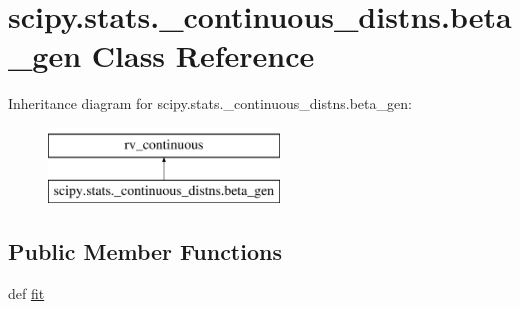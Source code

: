 \hypertarget{classscipy_1_1stats_1_1__continuous__distns_1_1beta__gen}{}\section{scipy.\+stats.\+\_\+continuous\+\_\+distns.\+beta\+\_\+gen Class Reference}
\label{classscipy_1_1stats_1_1__continuous__distns_1_1beta__gen}
Inheritance diagram for scipy.\+stats.\+\_\+continuous\+\_\+distns.\+beta\+\_\+gen\+:\begin{figure}[H]
\begin{center}
\leavevmode
\includegraphics[height=2.000000cm]{classscipy_1_1stats_1_1__continuous__distns_1_1beta__gen}
\end{center}
\end{figure}
\subsection*{Public Member Functions}
\begin{DoxyCompactItemize}
\item 
def \hyperlink{classscipy_1_1stats_1_1__continuous__distns_1_1beta__gen_a712f2f4b62b55b3d59506850e6e8a536}{fit}
\end{DoxyCompactItemize}



